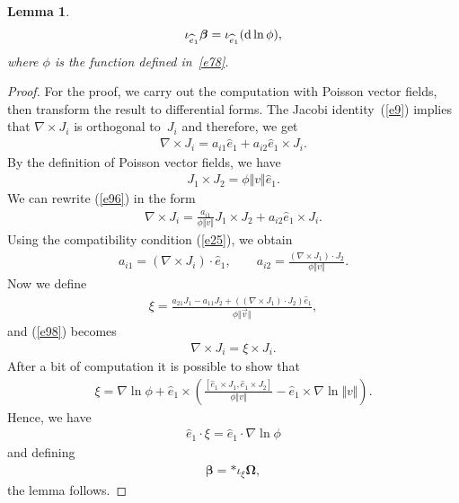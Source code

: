\documentclass[10pt,a4paper]{amsart}
\numberwithin{equation}{section}
\newtheorem{Lemma}[Theorem]{Lemma}
\begin{document}
\begin{Lemma}\label{lemma2}
\begin{gather*}
\iota _{\widehat{e}_{1}}\boldsymbol{\beta }=\iota _{\widehat{e}_{1}} ( {\rm d}\ln \phi ),
\end{gather*}
where $\phi $ is the function defined in~\eqref{e78}.
\end{Lemma}

\begin{proof}
For the proof, we carry out the computation with Poisson vector f\/ields, then transform the result to dif\/ferential forms. The Jacobi identity~(\ref{e9}) implies that $\nabla \times J_{i}$ is orthogonal to~$J_{i}$ and therefore, we get
\begin{gather}
\nabla \times J_{i}=a_{i1}\widehat{e}_{1}+a_{i2}\widehat{e}_{1}\times J_{i}.\label{e96}
\end{gather}
By the def\/inition of Poisson vector f\/ields, we have
\begin{gather*}
J_{1}\times J_{2}=\phi \Vert v\Vert \widehat{e}_{1}.
\end{gather*}
We can rewrite (\ref{e96}) in the form
\begin{gather}
\nabla \times J_{i}=\frac{a_{i1}}{\phi \Vert v\Vert }J_{1}\times J_{2}+a_{i2}\widehat{e}_{1}\times J_{i}. \label{e98}
\end{gather}
Using the compatibility condition (\ref{e25}), we obtain
\begin{gather*}
a_{i1} = ( \nabla \times J_{i}) \cdot \widehat{e}_{1}, \qquad
a_{i2} = \frac{( \nabla \times J_{1}) \cdot J_{2}}{\phi\Vert v\Vert }.
\end{gather*}
Now we def\/ine
\begin{gather*}
\xi =\frac{a_{21}J_{1}-a_{11}J_{2}+( ( \nabla \times J_{1}) \cdot J_{2}) \widehat{e}_{1}}{\phi \Vert \overrightarrow{v}\Vert },
\end{gather*}
and (\ref{e98}) becomes
\begin{gather*}
\nabla \times J_{i}=\xi \times J_{i}.
\end{gather*}
After a bit of computation it is possible to show that
\begin{gather*}
\xi =\nabla \ln \phi +\widehat{e}_{1}\times \left( \frac{[ \widehat{e}_{1}\times J_{1},\widehat{e}_{1}\times J_{2}] }{\phi \Vert
v\Vert }-\widehat{e}_{1}\times \nabla \ln \Vert v\Vert\right).
\end{gather*}
Hence, we have
\begin{gather*}
\widehat{e}_{1}\cdot \xi =\widehat{e}_{1}\cdot \nabla \ln \phi
\end{gather*}
and def\/ining
\begin{gather*}
\boldsymbol{\beta }=\ast \iota _{\xi }\boldsymbol{\Omega},
\end{gather*}
the lemma follows.
\end{proof}
\end{document}
